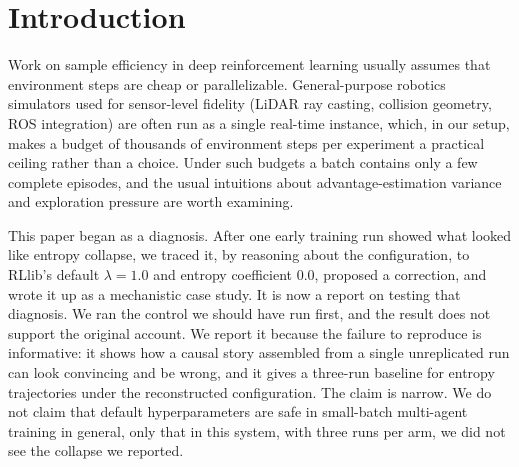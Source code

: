\documentclass[12pt]{article}
\begin{document}
\section{Introduction}
Work on sample efficiency in deep reinforcement learning usually assumes that
environment steps are cheap or parallelizable. General-purpose robotics
simulators used for sensor-level fidelity (LiDAR ray casting, collision
geometry, ROS integration) are often run as a single real-time instance,
which, in our setup, makes a budget of thousands of environment steps per experiment a practical
ceiling rather than a choice. Under such budgets a batch contains only a few
complete episodes, and the usual intuitions about advantage-estimation
variance and exploration pressure are worth examining.

This paper began as a diagnosis. After one early training run showed what
looked like entropy collapse, we traced it, by reasoning about the
configuration, to RLlib's default $\lambda=1.0$ and entropy coefficient
$0.0$, proposed a correction, and wrote it up as a mechanistic case study. It
is now a report on testing that diagnosis. We ran the control we should have
run first, and the result does not support the original account. We report it
because the failure to reproduce is informative: it shows how a causal story
assembled from a single unreplicated run can look convincing and be wrong,
and it gives a three-run baseline for entropy trajectories under the reconstructed configuration.
The claim is narrow. We do not claim that default hyperparameters are safe in
small-batch multi-agent training in general, only that in this system, with
three runs per arm, we did not see the collapse we reported.
\end{document}
